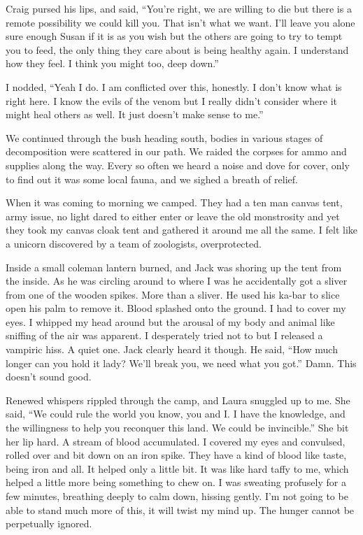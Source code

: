 Craig pursed his lips, and said, ``You're right, we are willing to die but there is a remote possibility we could kill you. That isn't what we want. I'll leave you alone sure enough Susan if it is as you wish but the others are going to try to tempt you to feed, the only thing they care about is being healthy again. I understand how they feel. I think you might too, deep down.''

I nodded, ``Yeah I do. I am conflicted over this, honestly. I don't know what is right here. I know the evils of the venom but I really didn't consider where it might heal others as well. It just doesn't make sense to me.''

We continued through the bush heading south, bodies in various stages of decomposition were scattered in our path. We raided the corpses for ammo and supplies along the way. Every so often we heard a noise and dove for cover, only to find out it was some local fauna, and we sighed a breath of relief.

When it was coming to morning we camped. They had a ten man canvas tent, army issue, no light dared to either enter or leave the old monstrosity and yet they took my canvas cloak tent and gathered it around me all the same. I felt like a unicorn discovered by a team of zoologists, overprotected.

Inside a small coleman lantern burned, and Jack was shoring up the tent from the inside. As he was circling around to where I was he accidentally got a sliver from one of the wooden spikes. More than a sliver. He used his ka-bar to slice open his palm to remove it. Blood splashed onto the ground. I had to cover my eyes. I whipped my head around but the arousal of my body and animal like sniffing of the air was apparent. I desperately tried not to but I released a vampiric hiss. A quiet one. Jack clearly heard it though. He said, ``How much longer can you hold it lady? We'll break you, we need what you got.'' Damn. This doesn't sound good.

Renewed whispers rippled through the camp, and Laura snuggled up to me. She said, ``We could rule the world you know, you and I. I have the knowledge, and the willingness to help you reconquer this land. We could be invincible.'' She bit her lip hard. A stream of blood accumulated. I covered my eyes and convulsed, rolled over and bit down on an iron spike. They have a kind of blood like taste, being iron and all. It helped only a little bit. It was like hard taffy to me, which helped a little more being something to chew on. I was sweating profusely for a few minutes, breathing deeply to calm down, hissing gently. I'm not going to be able to stand much more of this, it will twist my mind up. The hunger cannot be perpetually ignored.

